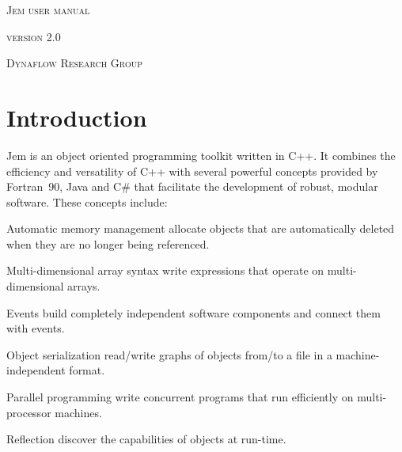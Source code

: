 \documentclass[a4paper,10pt]{article}
\begin{document}
\begin{titlepage}

  \begin{center}

    \vspace*{2cm}

    {\Huge \textsc{Jem user manual}}

    \vspace{1cm}

    {\large \textsc{version 2.0}}

    \vspace{2cm}

    {\large \textsc{Dynaflow Research Group}}

  \end{center}

\end{titlepage}

\tableofcontents

\newpage


\section{Introduction}

Jem is an object oriented programming toolkit written in C++. It combines
the efficiency and versatility of C++ with several powerful concepts
provided by Fortran~90, Java and C\# that facilitate the development of
robust, modular software. These concepts include:
\begin{Description}[\textit]

\item[Automatic memory management] allocate objects that are
  automatically deleted when they are no longer being referenced.

\item[Multi-dimensional array syntax] write expressions that operate
  on multi-dimensional arrays.

\item[Events] build completely independent software components and
  connect them with events.

\item[Object serialization] read/write graphs of objects from/to a
  file in a machine-independent format.

\item[Parallel programming] write concurrent programs that run
  efficiently on multi-processor machines.

\item[Reflection] discover the capabilities of objects at run-time.

\end{Description}
\end{document}
